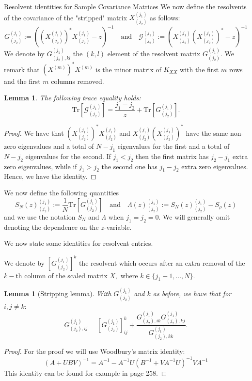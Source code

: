 \documentclass[11pt, a4paper, oneside]{book}
\numberwithin{equation}{chapter}
\newcommand{\Tr}{\mathrm{Tr}}
\newcommand{\beq}{\begin{equation}}
\newcommand{\eeq}{\end{equation}}
\newtheorem{lem}[thm]{Lemma}
\begin{document}
\begin{section}{Resolvent identities for Sample Covariance Matrices}
We now define the resolvents of the covariance of the "stripped" matrix $X_{(j_2)}^{(j_1)}$ as follows:
%
\beq \label{res1}
    G^{(j_1)}_{(j_2)}:=\left((X^{(j_1)}_{(j_2)})^* X^{(j_1)}_{(j_2)}- z \right)^{-1} \quad \text{and} \quad \mathcal{G}^{(j_1)}_{(j_2)}:=\left(X^{(j_1)}_{(j_2)}(X^{(j_1)}_{(j_2)})^*  - z \right)^{-1}
\eeq
%
We denote by $G_{(j_2),kl}^{(j_1)}$ the $(k,l)$ element of the resolvent matrix $G_{(j_2)}^{(j_1)}.$ We remark that $(X^{(m)})^*X^{(m)}$ is the minor matrix of $K_{XX}$ with the first $m$ rows and the first $m$ columns removed.
%
\begin{lem}
The following trace equality holds:
\begin{equation} \label{e:traces}
    \Tr \left [ \mathcal{G}^{(j_1)}_{(j_2)} \right ] =  \frac{j_1-j_2}{z} + \Tr \left [ G^{(j_1)}_{(j_2)} \right ].
\end{equation}
\end{lem}
%
\begin{proof}
    We have that $(X_{(j_2)}^{(j_1)})^*X_{(j_2)}^{(j_1)}$ and $X_{(j_2)}^{(j_1)}(X_{(j_2)}^{(j_1)})^*$ have the same non-zero eigenvalues and a total of $N-j_1$ eigenvalues for the first and a total of $N-j_2$ eigenvalues for the second. If $j_1 < j_2$ then the first matrix has $j_2 - j_1$ extra zero eigenvalues, while if $j_1 > j_2$ the second one has $j_1 - j_2$ extra zero eigenvalues. Hence, we have the identity.
\end{proof}
%
We now define the following quantities
\begin{equation} \label{d:S-Lambda}
    S_N (z)^{(j_1)}_{(j_2)} := \frac{1}{N} \Tr \left [G^{(j_1)}_{(j_2)} \right ] \quad \text{and} \quad \Lambda (z)^{(j_1)}_{(j_2)} := S_N (z)^{(j_1)}_{(j_2)} - S_{\rho}(z)
\end{equation}
and we use the notation $S_N$ and $\Lambda$ when $j_1 = j_2 = 0$. We will generally omit denoting the dependence on the $z$-variable.

We now state some identities for resolvent entries. 

We denote by $\left [ G^{(j_1)}_{(j_2)} \right ]^k$ the resolvent which occurs after an extra removal of the $k-$th column of the scaled matrix $X,$ where $k\in \{j_1+1,...,N\}.$
%
\begin{lem}[Stripping lemma] \label{l:resol1}
 With $G^{(j_1)}_{(j_2)}$ and $k$ as before, we have that for $i,j \neq k :$
\begin{equation} \label{e:resol1}
 G^{(j_1)}_{(j_2), ij} = \left [ G^{(j_1)}_{(j_2)} \right ]^k_{ij} + \frac{G^{(j_1)}_{(j_2), ik}G^{(j_1)}_{(j_2), kj}}{G^{(j_1)}_{(j_2), kk}}.
 \end{equation}
\end{lem}
%
\begin{proof}
    For the proof we will use Woodbury's matrix identity:
    \[
       (A + UBV)^{-1} = A^{-1} - A^{-1} U ( B^{-1} + VA^{-1}U)^{-1}VA^{-1}
    \]
    This identity can be found for example in \cite{higham2002accuracy} page 258.


\end{proof}
\end{section}
\end{document}
